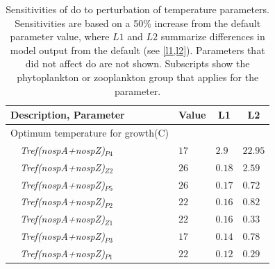 \documentclass[letterpaper,12pt,oneside]{article}\usepackage[]{graphicx}\usepackage[]{color}
\begin{document}
\begin{table}[!tbp]
{\normalsize
\caption{Sensitivities of \ac{do} to perturbation of temperature parameters.  Sensitivities are based on a 50\% increase from the default parameter value, where $L1$ and $L2$ summarize differences in model output from the default (see \cref{l1,l2}).  Parameters that did not affect \ac{do} are not shown.  Subscripts show the phytoplankton or zooplankton group that applies for the parameter.\label{tab:tempsens}} 
\begin{center}
\begin{tabular}{llll}
\hline\hline
\multicolumn{1}{l}{Description, Parameter}&\multicolumn{1}{c}{Value}&\multicolumn{1}{c}{L1}&\multicolumn{1}{c}{L2}\tabularnewline
\hline
{Optimum temperature for growth(C)}&&&\tabularnewline
~~\textit{Tref(nospA+nospZ)$_{P4}$}&$17$&$2.9$&$22.95$\tabularnewline
~~\textit{Tref(nospA+nospZ)$_{Z2}$}&$26$&$0.18$&$2.59$\tabularnewline
~~\textit{Tref(nospA+nospZ)$_{P5}$}&$26$&$0.17$&$0.72$\tabularnewline
~~\textit{Tref(nospA+nospZ)$_{P2}$}&$22$&$0.16$&$0.82$\tabularnewline
~~\textit{Tref(nospA+nospZ)$_{Z1}$}&$22$&$0.16$&$0.33$\tabularnewline
~~\textit{Tref(nospA+nospZ)$_{P3}$}&$17$&$0.14$&$0.78$\tabularnewline
~~\textit{Tref(nospA+nospZ)$_{P1}$}&$22$&$0.12$&$0.29$\tabularnewline
\hline
\end{tabular}\end{center}}

\end{table}
\end{document}
